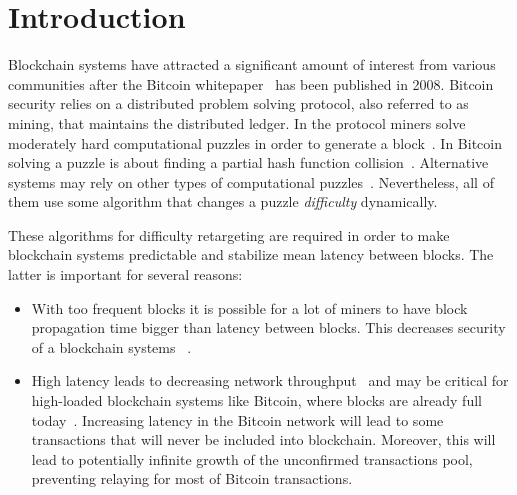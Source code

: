 \documentclass[number,preprint,review]{elsarticle}
\begin{document}
\section{Introduction}
\label{sec:intro}

Blockchain systems have attracted a significant amount of interest from various communities after the Bitcoin whitepaper~\cite{Nakamoto2008} has been published in 2008.
Bitcoin security relies on a distributed problem solving protocol, also referred to as mining, that maintains the distributed ledger.
In the protocol miners solve moderately hard computational puzzles in order to generate a block~\cite{}. In Bitcoin solving a puzzle is about finding a partial hash function collision~\cite{}.
Alternative systems may rely on other types of computational puzzles~\cite{??}. Nevertheless, all of them use some algorithm that changes a puzzle \textit{difficulty} dynamically.

These algorithms for difficulty retargeting are required in order to make blockchain systems predictable and stabilize mean latency between blocks. The latter is important for several reasons:

\begin{itemize}
\item{With too frequent blocks it is possible for a lot of miners to have block propagation time bigger than latency between blocks. This decreases security of a blockchain systems ~\cite{decker2013information,garay2015bitcoin}.}

\item{High latency leads to decreasing network throughput~\cite{miller2016} and may be critical for high-loaded blockchain systems like Bitcoin, where blocks are already full today~\cite{armstrong2016}. Increasing latency in the Bitcoin network will lead to some transactions that will never be included into blockchain. Moreover, this will lead to potentially infinite growth of the unconfirmed transactions pool, preventing relaying for most of Bitcoin transactions.}
\end{itemize}
\end{document}
